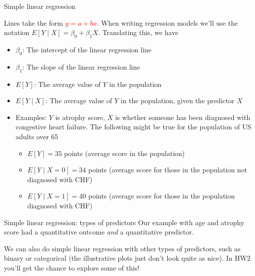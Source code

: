 \documentclass[10pt,t]{beamer}
\begin{document}
\begin{frame}{Simple linear regression}
	
	\vspace{-5 mm}
	
Lines take the form \textcolor{red}{$y = a + bx$}. When writing regression models we'll use the notation $E[Y \mid X] = \beta_0 + \beta_1 X$. Translating this, we have

\vspace{0.3cm}

\begin{itemize}
	\item $\beta_0$: The intercept of the linear regression line
	\item $\beta_1$: The slope of the linear regression line
	\item $E[Y]$: The average value of $Y$ in the population
	\item $E[Y \mid X]$: The average value of $Y$ in the population, given the predictor $X$ \pause
	\smallskip
	\item Examples: $Y$ is atrophy score, $X$ is whether someone has been diagnosed with congestive heart failure. The following might be true for the population of US adults over 65
	\begin{itemize}
		\smallskip
		\item $E[Y] = 35$ points (average score in the population)
		\item $E[Y \mid X = 0] = 34$ points (average score for those in the population not diagnosed with CHF)
		\item $E[Y \mid X = 1] = 40$ points (average score for those in the population diagnosed with CHF)
	\end{itemize}
\end{itemize}
\end{frame}

\begin{frame}{Simple linear regression: types of predictors}
Our example with age and atrophy score had a quantitative outcome \textit{and} a quantitative predictor. 

\vspace{0.3cm}

We can also do simple linear regression with other types of predictors, such as binary or categorical (the illustrative plots just don't look quite as nice). In HW2 you'll get the chance to explore some of this!
\end{frame}
\end{document}
